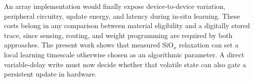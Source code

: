 \noindent An array implementation would finally expose device-to-device variation, peripheral circuitry, update energy,
and latency during in-situ learning. These costs belong in any comparison between material eligibility and a digitally
stored trace, since sensing, routing, and weight programming are required by both approaches. The present work shows
that measured SiO$_x$ relaxation can set a local learning timescale otherwise chosen as an algorithmic parameter.
A direct variable-delay write must now decide whether that volatile state can also gate a persistent update in
hardware.
